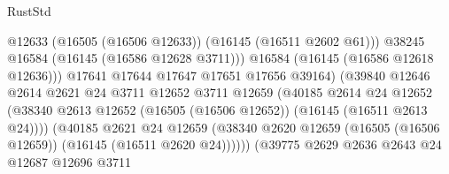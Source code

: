 \begin{lexlean}{RustStd}
\begin{coremodule}
                                                @12633
                                                (@16505 (@16506 @12633))
                                                (@16145 (@16511 @2602 @61)))
                                              @38245
                                              @16584
                                              (@16145 (@16586 @12628 @3711)))
                                            @16584
                                            (@16145 (@16586 @12618 @12636)))
                                          @17641
                                          @17644
                                          @17647
                                          @17651
                                          @17656
                                          @39164)
                                        (@39840
                                          @12646
                                          @2614
                                          @2621
                                          @24
                                          @3711
                                          @12652
                                          @3711
                                          @12659
                                          (@40185
                                            @2614
                                            @24
                                            @12652
                                            (@38340
                                              @2613
                                              @12652
                                              (@16505 (@16506 @12652))
                                              (@16145 (@16511 @2613 @24))))
                                          (@40185
                                            @2621
                                            @24
                                            @12659
                                            (@38340
                                              @2620
                                              @12659
                                              (@16505 (@16506 @12659))
                                              (@16145 (@16511 @2620 @24))))))
                                      (@39775
                                        @2629
                                        @2636
                                        @2643
                                        @24
                                        @12687
                                        @12696
                                        @3711

\end{coremodule}
\end{lexlean}
